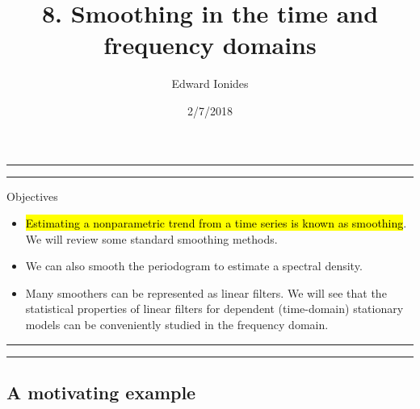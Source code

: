 \documentclass[]{article}
\title{8. Smoothing in the time and frequency domains}
\author{Edward Ionides}
\date{2/7/2018}
\begin{document}
\maketitle

{
\setcounter{tocdepth}{2}
\tableofcontents
}
\newcommand\prob{\mathbb{P}}
\newcommand\E{\mathbb{E}}
\newcommand\var{\mathrm{Var}}
\newcommand\cov{\mathrm{Cov}}
\newcommand\loglik{\ell}
\newcommand\R{\mathbb{R}}
\newcommand\data[1]{#1^*}
\newcommand\params{\, ; \,}
\newcommand\transpose{\scriptsize{T}}
\newcommand\eqspace{\quad\quad\quad}
\newcommand\lik{\mathscr{L}}
\newcommand\profileloglik[1]{\ell^\mathrm{profile}_#1}
\newcommand\ar{\phi}
\newcommand\ma{\psi}
\newcommand\AR{\Phi}
\newcommand\MA{\Psi}
\newcommand\ev{u}





\begin{center}\rule{0.5\linewidth}{\linethickness}\end{center}

\begin{center}\rule{0.5\linewidth}{\linethickness}\end{center}

Objectives

\begin{itemize}
\item
  \hl{Estimating a nonparametric trend from a time series is known as
  smoothing}. We will review some standard smoothing methods.
\item
  We can also smooth the periodogram to estimate a spectral density.
\item
  Many smoothers can be represented as linear filters. We will see that
  the statistical properties of linear filters for dependent
  (time-domain) stationary models can be conveniently studied in the
  frequency domain.
\end{itemize}

\begin{center}\rule{0.5\linewidth}{\linethickness}\end{center}

\begin{center}\rule{0.5\linewidth}{\linethickness}\end{center}

\subsection{A motivating example}\label{a-motivating-example}
\end{document}

